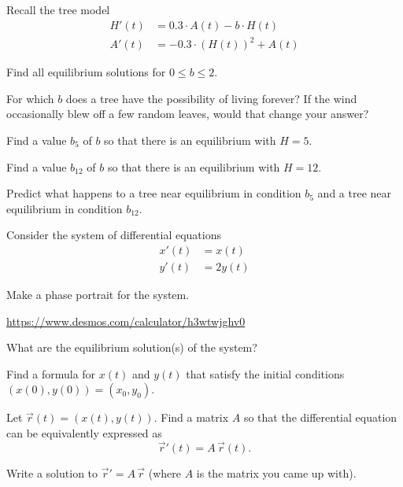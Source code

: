 \documentclass{workbook}
\begin{document}
\begin{slide}
	\question
	Recall the tree model
	\begin{align*}
		H'(t) &= 0.3\cdot A(t)-b\cdot H(t)\\
		A'(t) &= -0.3\cdot (H(t))^2 + A(t)
	\end{align*}

	\begin{parts}
		\item Find all equilibrium solutions for $0\leq b\leq 2$.
		\item For which $b$ does a tree have the possibility of living forever? If the wind occasionally blew off a few random leaves,
		would that change your answer?
		\item
		Find a value $b_5$ of $b$ so that there is an equilibrium with $H=5$.

		Find a value $b_{12}$ of $b$ so that there is an equilibrium with $H=12$.
		
		\item
		Predict what happens to a tree near equilibrium in condition $b_5$ and a tree near equilibrium in condition $b_{12}$.

	\end{parts}
\end{slide}

%
%

\begin{slide}
	\question
	Consider the system of differential equations
	\begin{align*}
		x'(t) &= x(t)\\
		y'(t) &= 2y(t)
	\end{align*}

	\begin{parts}
		\item Make a phase portrait for the system.

		{\small \url{https://www.desmos.com/calculator/h3wtwjghv0}}
		\item What are the equilibrium solution(s) of the system?
		\item 
		Find a formula for $x(t)$ and $y(t)$ that satisfy the initial conditions $(x(0), y(0))=(x_0, y_0)$.
		\item Let $\vec r(t)=(x(t),y(t))$. Find a matrix $A$ so that the differential equation can be equivalently expressed
		as
		\[
			\vec r'(t) = A\,\vec r(t).
		\]
		\item Write a solution to $\vec r' = A\,\vec r$ (where $A$ is the matrix you came up with).
	\end{parts}
\end{slide}
\end{document}
